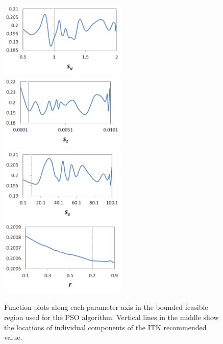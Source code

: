 \documentclass[]{spie}  %
\begin{document}
\begin{figure}
\begin{center}
\includegraphics[width=2.4in]{f_plot_p0}
\includegraphics[width=2.4in]{f_plot_p1}
\includegraphics[width=2.4in]{f_plot_p2}
\includegraphics[width=2.4in]{f_plot_p3}
\end{center}
\caption{Function plots along each parameter axis in the bounded feasible region used for the PSO algorithm. Vertical lines in the middle show the locations of individual components of the ITK recommended value.}
\label{fig:f_plots}
\end{figure}
\end{document}
